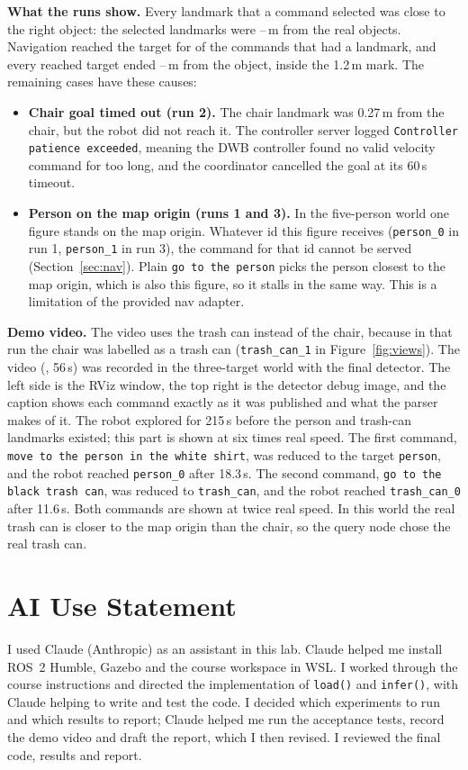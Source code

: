 \documentclass[11pt]{article}
\begin{document}
\textbf{What the runs show.} Every landmark that a command selected was close to the right object: the \NLandmarks{} selected landmarks were \LmErrMin--\LmErrMax\,m from the real objects. Navigation reached the target for \NReached{} of the \NNavigable{} commands that had a landmark, and every reached target ended \DistMin--\DistMax\,m from the object, inside the 1.2\,m mark. The remaining cases have these causes:
\begin{itemize}[leftmargin=1.2em]
\item \textbf{Chair goal timed out (run 2).} The chair landmark was 0.27\,m from the chair, but the robot did not reach it. The controller server logged \texttt{Controller patience exceeded}, meaning the DWB controller found no valid velocity command for too long, and the coordinator cancelled the goal at its 60\,s timeout.
\item \textbf{Person on the map origin (runs 1 and 3).} In the five-person world one figure stands on the map origin. Whatever id this figure receives (\texttt{person\_0} in run 1, \texttt{person\_1} in run 3), the command for that id cannot be served (Section~\ref{sec:nav}). Plain \texttt{go to the person} picks the person closest to the map origin, which is also this figure, so it stalls in the same way. This is a limitation of the provided nav adapter.
\end{itemize}

\textbf{Demo video.} The video uses the trash can instead of the chair, because in that run the chair was labelled as a trash can (\texttt{trash\_can\_1} in Figure~\ref{fig:views}). The video (, 56\,s) was recorded in the three-target world with the final detector. The left side is the RViz window, the top right is the detector debug image, and the caption shows each command exactly as it was published and what the parser makes of it. The robot explored for 215\,s before the person and trash-can landmarks existed; this part is shown at six times real speed. The first command, \texttt{move to the person in the white shirt}, was reduced to the target \texttt{person}, and the robot reached \texttt{person\_0} after 18.3\,s. The second command, \texttt{go to the black trash can}, was reduced to \texttt{trash\_can}, and the robot reached \texttt{trash\_can\_0} after 11.6\,s. Both commands are shown at twice real speed. In this world the real trash can is closer to the map origin than the chair, so the query node chose the real trash can.

\section*{AI Use Statement}

I used Claude (Anthropic) as an assistant in this lab. Claude helped me install ROS~2 Humble, Gazebo and the course workspace in WSL. I worked through the course instructions and directed the implementation of \texttt{load()} and \texttt{infer()}, with Claude helping to write and test the code. I decided which experiments to run and which results to report; Claude helped me run the acceptance tests, record the demo video and draft the report, which I then revised. I reviewed the final code, results and report.
\end{document}
